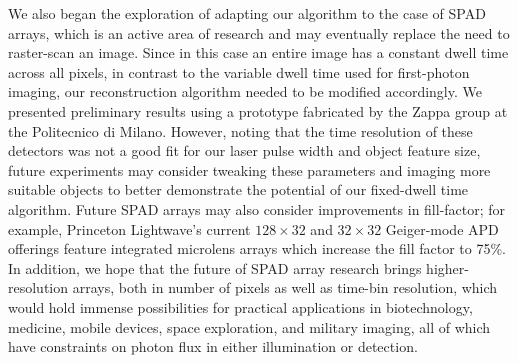 We also began the exploration of adapting our algorithm to the case of SPAD arrays, which is an active area of research and may eventually replace the need to raster-scan an image. Since in this case an entire image has a constant dwell time across all pixels, in contrast to the variable dwell time used for first-photon imaging, our reconstruction algorithm needed to be modified accordingly. We presented preliminary results using a prototype fabricated by the Zappa group at the Politecnico di Milano. However, noting that the time resolution of these detectors was not a good fit for our laser pulse width and object feature size, future experiments may consider tweaking these parameters and imaging more suitable objects to better demonstrate the potential of our fixed-dwell time algorithm. Future SPAD arrays may also consider improvements in fill-factor; for example, Princeton Lightwave's current $128\times32$ and $32\times32$ Geiger-mode APD offerings \cite{princetonlightwave} feature integrated microlens arrays which increase the fill factor to 75\%. In addition, we hope that the future of SPAD array research brings higher-resolution arrays, both in number of pixels as well as time-bin resolution, which would hold immense possibilities for practical applications in biotechnology, medicine, mobile devices, space exploration, and military imaging, all of which have constraints on photon flux in either illumination or detection.

